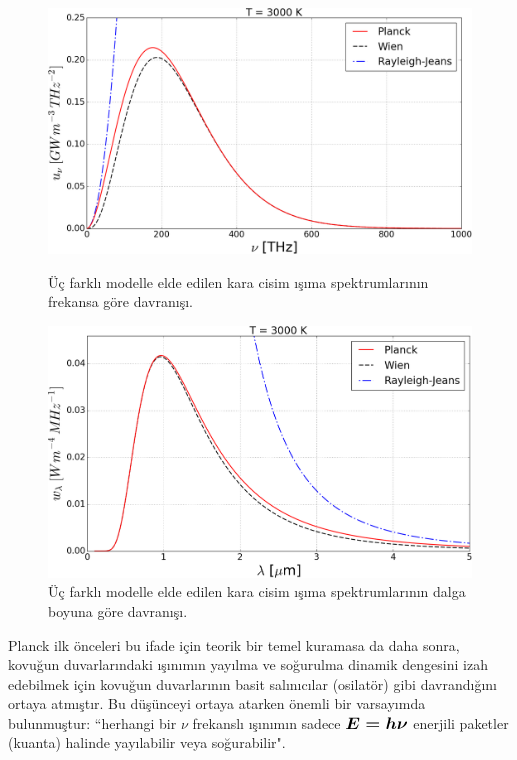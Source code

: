 \documentclass[a4paper,12pt, twoside]{article}
\begin{document}
\begin{figure}[hbtp]
\begin{minipage}{0.49\textwidth}
\center
\includegraphics[scale=.22]{blackbody_spect_vs_frequency_diff_models.png}
\caption{Üç farklı modelle elde edilen kara cisim ışıma spektrumlarının frekansa göre davranışı.}
\label{fig:karaSpektrum_nu}
\end{minipage}
\hspace{12pt}
\begin{minipage}{0.49\textwidth}
\center
\includegraphics[scale=.22]{blackbody_spect_vs_wavelength_diff_models.png}
\caption{Üç farklı modelle elde edilen kara cisim ışıma spektrumlarının dalga boyuna göre davranışı.}
\label{fig:karaSpektrum_lambda}
\end{minipage}
\end{figure}

Planck ilk önceleri bu ifade için teorik bir temel kuramasa da daha sonra, kovuğun duvarlarındaki ışınımın yayılma ve soğurulma dinamik dengesini izah edebilmek için kovuğun duvarlarının basit salınıcılar (osilatör) gibi davrandığını ortaya atmıştır. Bu düşünceyi ortaya atarken önemli bir varsayımda bulunmuştur: ``herhangi bir  $\nu$ frekanslı ışınımın sadece $\large \boldsymbol{E=h\nu}$ enerjili paketler (kuanta) halinde yayılabilir veya soğurabilir".
\end{document}
